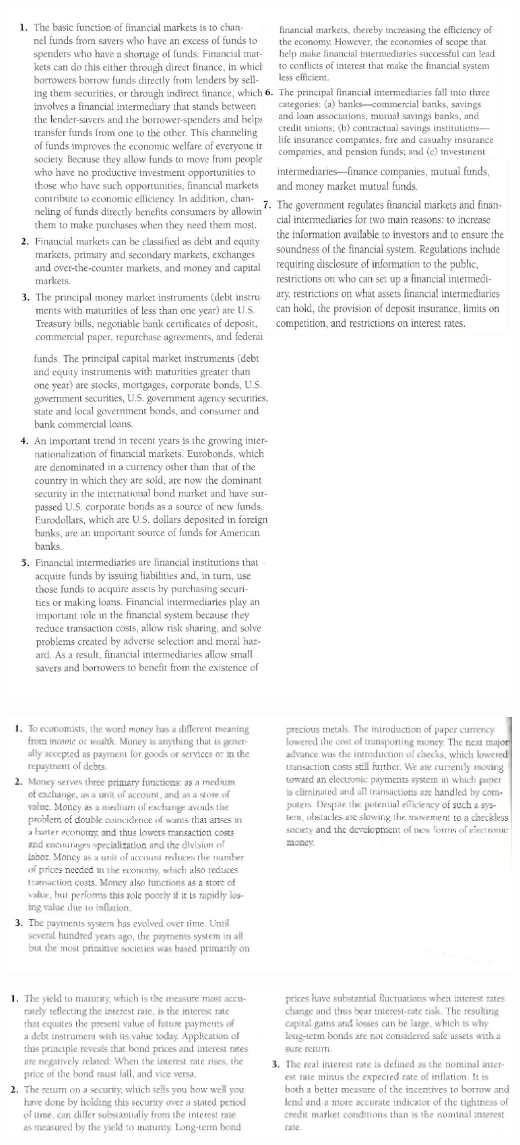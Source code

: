 \documentclass[12pt]{examnotes}
\begin{document}
\obeylines  
\setlength\baselineskip{15pt}

\includegraphics[scale=0.3]{./imgs/sum2.jpg}

\includegraphics[scale=0.5]{./imgs/sum3.jpg}

\includegraphics[scale=0.5]{./imgs/sum4.jpg}
\end{document}
